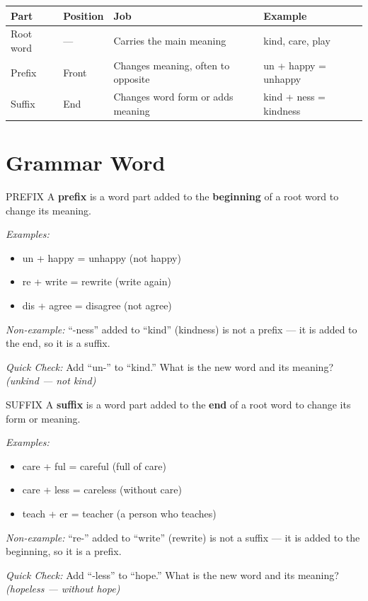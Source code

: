 \begin{table}[h!]
\centering
\begin{tabular}{|l|l|l|l|}
\hline
\textbf{Part} & \textbf{Position} & \textbf{Job} & \textbf{Example} \\
\hline
Root word & --- & Carries the main meaning & kind, care, play \\
Prefix & Front & Changes meaning, often to opposite & un + happy = unhappy \\
Suffix & End & Changes word form or adds meaning & kind + ness = kindness \\
\hline
\end{tabular}
\end{table}

\section{Grammar Word}
\begin{grammarword}{PREFIX}
A \textbf{prefix} is a word part added to the \textbf{beginning} of a root word to change its meaning.

\textit{Examples:}
\begin{itemize}
    \item un + happy = unhappy (not happy)
    \item re + write = rewrite (write again)
    \item dis + agree = disagree (not agree)
\end{itemize}

\textit{Non-example:} ``-ness'' added to ``kind'' (kindness) is not a prefix --- it is added to the end, so it is a suffix.

\textit{Quick Check:} Add ``un-'' to ``kind.'' What is the new word and its meaning? \textit{(unkind --- not kind)}
\end{grammarword}

\begin{grammarword}{SUFFIX}
A \textbf{suffix} is a word part added to the \textbf{end} of a root word to change its form or meaning.

\textit{Examples:}
\begin{itemize}
    \item care + ful = careful (full of care)
    \item care + less = careless (without care)
    \item teach + er = teacher (a person who teaches)
\end{itemize}

\textit{Non-example:} ``re-'' added to ``write'' (rewrite) is not a suffix --- it is added to the beginning, so it is a prefix.

\textit{Quick Check:} Add ``-less'' to ``hope.'' What is the new word and its meaning? \textit{(hopeless --- without hope)}
\end{grammarword}


